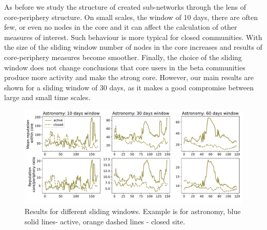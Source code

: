 As before we study the structure of created sub-networks through the lens of core-periphery structure. On small scales, the window of 10 days, there are often few, or even no nodes in the core and it can affect the calculation of other measures of interest. Such behaviour is more typical for closed communities.  With the size of the sliding window number of nodes in the core increases and results of core-periphery measures %
become smoother. Finally, the choice of the sliding window does not change conclusions that core users in the beta communities produce more activity and make the strong core. However, our main results are shown for a sliding window of 30 days, as it makes a good compromise between large and small time scales.  

\begin{figure}[h!]
	\centering
	\includegraphics[width=\linewidth]{figures/stackexchange/sliding_window_core_reputation.pdf}
	\caption{Results for different sliding windows. Example is for astronomy, blue solid lines- active, orange dashed lines - closed site. }
	\label{fig:windows}
\end{figure}
